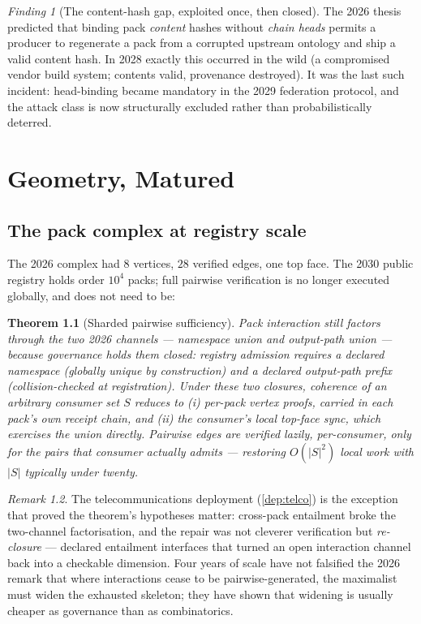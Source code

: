 \documentclass[11pt,a4paper]{report}
\newtheorem{theorem}{Theorem}[chapter]
\theoremstyle{definition}
\theoremstyle{remark}
\newtheorem{remark}[theorem]{Remark}
\newtheorem{finding}[theorem]{Finding}
\begin{document}
\begin{finding}[The content-hash gap, exploited once, then closed]
The 2026 thesis predicted that binding pack \emph{content} hashes without
\emph{chain heads} permits a producer to regenerate a pack from a corrupted
upstream ontology and ship a valid content hash. In 2028 exactly this
occurred in the wild (a compromised vendor build system; contents valid,
provenance destroyed). It was the last such incident: head-binding became
mandatory in the 2029 federation protocol, and the attack class is now
structurally excluded rather than probabilistically deterred.
\end{finding}

\chapter{Geometry, Matured}

\section{The pack complex at registry scale}

The 2026 complex had $8$ vertices, $28$ verified edges, one top face.
The 2030 public registry holds order $10^{4}$ packs; full pairwise
verification is no longer executed globally, and does not need to be:

\begin{theorem}[Sharded pairwise sufficiency]
Pack interaction still factors through the two 2026 channels ---
namespace union and output-path union --- \emph{because governance holds
them closed}: registry admission requires a declared namespace (globally
unique by construction) and a declared output-path prefix (collision-checked
at registration). Under these two closures, coherence of an arbitrary
consumer set $S$ reduces to (i) per-pack vertex proofs, carried in each
pack's own receipt chain, and (ii) the consumer's local top-face sync,
which exercises the union directly. Pairwise edges are verified lazily,
per-consumer, only for the pairs that consumer actually admits --- restoring
$O(|S|^2)$ local work with $|S|$ typically under twenty.
\end{theorem}

\begin{remark}
The telecommunications deployment (\ref{dep:telco}) is the exception that
proved the theorem's hypotheses matter: cross-pack entailment broke the
two-channel factorisation, and the repair was not cleverer verification but
\emph{re-closure} --- declared entailment interfaces that turned an open
interaction channel back into a checkable dimension. Four years of scale
have not falsified the 2026 remark that where interactions cease to be
pairwise-generated, the maximalist must widen the exhausted skeleton;
they have shown that widening is usually cheaper as governance than as
combinatorics.
\end{remark}
\end{document}
